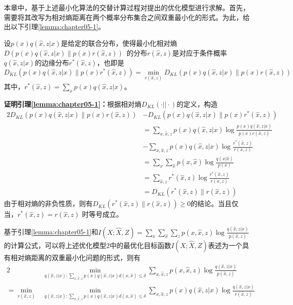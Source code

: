 本章中，基于上述最小化算法的交替计算过程对提出的优化模型进行求解。首先，需要将其改写为相对熵距离在两个概率分布集合之间双重最小化的形式。为此，给出以下引理\ref{lemma:chapter05-1}。
\begin{lemma}\label{lemma:chapter05-1}设$p(x)q(\hat{x},z|x)$是给定的联合分布，使得最小化相对熵$D(p(x)q(\hat{x},z|x)\parallel p(x)r(\hat{x},z))$~的分布$r(\hat{x},z)$是对应于条件概率$q(\hat{x},z|x)$的边缘分布$r^*(\hat{x},z)$，也即是
	\begin{equation}\label{lemma5.1}
		D_{KL}(p(x)q(\hat{x},z|x)\parallel p(x)r^*(\hat{x},z))=\min_{r(\hat{x},z)}D_{KL}(p(x)q(\hat{x},z|x)\parallel p(x)r(\hat{x},z))
	\end{equation}
	其中，$r^*(\hat{x},z)=\sum_{x}p(x)q(\hat{x},z|x)$。
\end{lemma}
\textbf{证明引理\ref{lemma:chapter05-1}：}根据相对熵$D_{KL}(\cdot||\cdot)$的定义，构造
\begin{alignat}{2}
	D_{KL}\left( p(x)q(\hat{x},z|x)\parallel p(x)r(\hat{x},z)\right)
	 & -D_{KL}\left(p(x)q(\hat{x},z|x)\parallel p(x)r^{*}(\hat{x},z)\right) \\
	 & =\sum_{x,\hat{x},z}p(x)q(\hat{x},z|x)\log \frac{p(x)q(\hat{x},z|x)}{p(x)r(\hat{x},z)}\\
	 & - \sum_{x,\hat{x},z}p(x)q(\hat{x},z|x)\log \frac{r^*(\hat{x},z)}{r(x,z)}\\
	 & = \sum_{x}\sum_{\hat{x}}p(x,\hat{x})\log \frac{q(x|\hat{x})}{p(x)} \nonumber \\
	 &=\sum_{\hat{x},z}r^*(\hat{x},z)\log \frac{r^*(\hat{x},z)}{r(x,z)}\\
	 & =D_{KL}\left(r^*(\hat{x},z)\parallel r(\hat{x},z)\right)
\end{alignat}
由于相对熵的非负性质，则有$D_{KL}\left(r^*(\hat{x},z)\parallel r(\hat{x},z)\right)\geq 0$的结论。当且仅当，$r^*(\hat{x},z)= r(\hat{x},z)$ 时等号成立。

基于引理\ref{lemma:chapter05-1}和$I(X;\hat{X},Z)=\sum_{x}\sum_{\hat{x}}\sum_{z}p(x,\hat{x},z)\log \frac{q(\hat{x},z|x)}{p(\hat{x},z)}$的计算公式，可以将上述优化模型$2$中的最优化目标函数$I(X;\hat{X},Z)$表述为一个具有相对熵距离的双重最小化问题的形式，则有
\begin{alignat}{2}
& \min_{q(\hat{x},z|x):\sum_{x,\hat{x},z}p(x)q(\hat{x},z|x)d(x,\hat{x})\leq  \delta}\sum_{x,\hat{x},z} p(x,\hat{x},z)\log \frac{q(\hat{x},z|x)}{p(\hat{x},z)}\\
=\min_{r(\hat{x},z)}&\min_{q(\hat{x},z|x):\sum_{x,\hat{x},z}p(x)q(\hat{x},z|x)d(x,\hat{x})\leq  \delta}\sum_{x,\hat{x},z}p(x)q(\hat{x},z|x)\log \frac{q(\hat{x},z|x)}{r(\hat{x},z)}\label{eq:chapter05-double}
\end{alignat}

